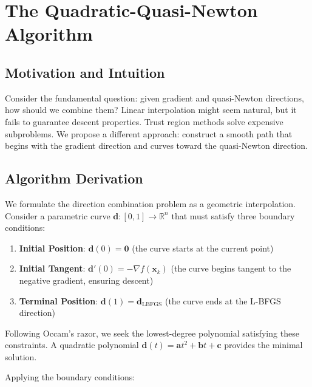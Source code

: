 \hypertarget{the-quadratic-quasi-newton-algorithm}{%
\section{The Quadratic-Quasi-Newton Algorithm}\label{the-quadratic-quasi-newton-algorithm}}

\hypertarget{motivation-and-intuition}{%
\subsection{Motivation and Intuition}\label{motivation-and-intuition}}

Consider the fundamental question: given gradient and quasi-Newton directions, how should we combine them?
Linear interpolation might seem natural, but it fails to guarantee descent properties.
Trust region methods solve expensive subproblems.
We propose a different approach: construct a smooth path that begins with the gradient direction and curves toward the quasi-Newton direction.

\hypertarget{algorithm-derivation}{%
\subsection{Algorithm Derivation}\label{algorithm-derivation}}

We formulate the direction combination problem as a geometric interpolation. Consider a parametric curve
\(\mathbf{d}: [0,1] \rightarrow \mathbb{R}^n\) that must satisfy three boundary conditions:

\begin{enumerate}
\def\labelenumi{\arabic{enumi}.}
\item
  \textbf{Initial Position}: \(\mathbf{d}(0) = \mathbf{0}\) (the curve starts at the current point)
\item
  \textbf{Initial Tangent}: \(\mathbf{d}'(0) = -\nabla f(\mathbf{x}_k)\) (the curve begins tangent to the negative gradient, ensuring descent)
\item
  \textbf{Terminal Position}: \(\mathbf{d}(1) = \mathbf{d}_{\text{LBFGS}}\) (the curve ends at the L-BFGS direction)
\end{enumerate}

Following Occam's razor, we seek the lowest-degree polynomial satisfying these constraints.
A quadratic polynomial \(\mathbf{d}(t) = \mathbf{a}t^2 + \mathbf{b}t + \mathbf{c}\) provides the minimal solution.

Applying the boundary conditions:


